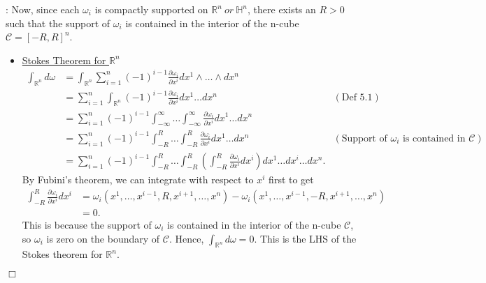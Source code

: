 \documentclass{article}
\theoremstyle{definition}
\theoremstyle{named}
\def\endproofmark{$\Box$}
\newenvironment{proof}{\par\noindent{\bf Proof}:}{\endproofmark\smallskip}
\begin{document}
\begin{proof}
    Now, since each $\omega_i$ is compactly supported on $\mathbb{R}^n \ or \ \mathbb{H}^n$, there exists an $R > 0$ such that the support of $\omega_i$ is contained in the interior of the n-cube $\mathcal{C} = [-R, R]^n$. 
    \begin{itemize}
        \item \underline{Stokes Theorem for $\mathbb{R}^n$}
        \begin{align*}
            \int_{\mathbb{R}^n} d\omega &= \int_{\mathbb{R}^n} \sum_{i=1}^n (-1)^{i-1} \frac{\partial \omega_i}{\partial x^i} dx^1 \wedge \ldots \wedge dx^n \\
            &= \sum_{i=1}^n \int_{\mathbb{R}^n}  (-1)^{i-1} \frac{\partial \omega_i}{\partial x^i} dx^1 \ldots dx^n & (\text{Def 5.1}) \\
            &= \sum_{i=1}^n (-1)^{i-1} \int_{-\infty}^{\infty} \ldots \int_{-\infty}^{\infty}  \frac{\partial \omega_i}{\partial x^i} dx^1 \ldots dx^n \\
            &= \sum_{i=1}^n (-1)^{i-1}\int_{-R}^R \ldots \int_{-R}^R  \frac{\partial \omega_i}{\partial x^i} dx^1 \ldots dx^n & (\text{Support of } \omega_i \text{ is contained in } \mathcal{C}) \\
            &= \sum_{i=1}^n (-1)^{i-1} \int_{-R}^R \ldots \int_{-R}^R  \left(
                \int_{-R}^{R} \frac{\partial \omega_i}{\partial x^i} dx^i
            \right) dx^1 \ldots \widehat{dx^i} \ldots dx^n .
        \end{align*}
        By Fubini's theorem, we can integrate with respect to $x^i$ first to get
        \begin{align*}
            \int_{-R}^{R} \frac{\partial \omega_i}{\partial x^i} dx^i &= \omega_i(x^1, \ldots, x^{i-1}, R, x^{i+1}, \ldots, x^n) - \omega_i(x^1, \ldots, x^{i-1}, -R, x^{i+1}, \ldots, x^n) \\
            &= 0.
        \end{align*}
        This is because the support of $\omega_i$ is contained in the interior of the n-cube $\mathcal{C}$, so $\omega_i$ is zero on the boundary of $\mathcal{C}$. Hence, $\int_{\mathbb{R}^n} d\omega = 0$. This is the LHS of the Stokes theorem for $\mathbb{R}^n$.


\end{itemize}
\end{proof}
\end{document}
